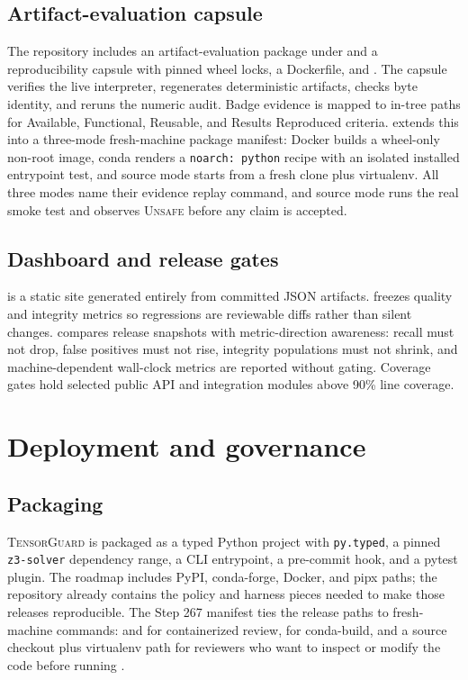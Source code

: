 \documentclass[11pt]{article}
\newcommand{\tg}{\textsc{TensorGuard}}
\newcommand{\unsafe}{\textsc{Unsafe}}
\begin{document}
\subsection{Artifact-evaluation capsule}

The repository includes an artifact-evaluation package under
 and a reproducibility capsule with pinned wheel locks,
a Dockerfile, and .  The capsule verifies the live
interpreter, regenerates deterministic artifacts, checks byte identity, and
reruns the numeric audit.  Badge evidence is mapped to in-tree paths for
Available, Functional, Reusable, and Results Reproduced criteria.
 extends this into a three-mode
fresh-machine package manifest: Docker builds a wheel-only non-root image,
conda renders a \texttt{noarch: python} recipe with an isolated installed
entrypoint test, and source mode starts from a fresh clone plus virtualenv.
All three modes name their evidence replay command, and source mode runs the
real  smoke test and observes \unsafe{} before any
claim is accepted.

\subsection{Dashboard and release gates}

 is a static site generated entirely from
committed JSON artifacts.   freezes
quality and integrity metrics so regressions are reviewable diffs rather than
silent changes.   compares release snapshots
with metric-direction awareness: recall must not drop, false positives must not
rise, integrity populations must not shrink, and machine-dependent wall-clock
metrics are reported without gating.  Coverage gates hold selected public API
and integration modules above 90\% line coverage.

\section{Deployment and governance}

\subsection{Packaging}

\tg{} is packaged as a typed Python project with \texttt{py.typed}, a pinned
\texttt{z3-solver} dependency range, a CLI entrypoint, a pre-commit hook, and a
pytest plugin.  The roadmap includes PyPI, conda-forge, Docker, and pipx paths;
the repository already contains the policy and harness pieces needed to make
those releases reproducible.  The Step 267 manifest ties the release paths to
fresh-machine commands:  and 
for containerized review,  for conda-build, and a
source checkout plus virtualenv path for reviewers who want to inspect or modify
the code before running .
\end{document}
